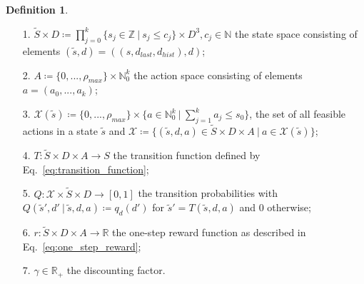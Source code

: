 \documentclass[journal, a4paper]{IEEEtran}
\theoremstyle{plain}
\theoremstyle{definition}
\newtheorem{defn}[thm]{Definition}
\begin{document}
\begin{defn} \label{def:modell} \
	\begin{itemize}
		\item[1.] $\tilde{S}  \times D \coloneqq \prod\limits_{j=0}^{k} \{s_j \in \mathbb{Z} \ | \ s_j \leq c_j\} \times D^3, c_j \in \mathbb{N}$ the state space consisting of elements $(\tilde{s}, d) = ((s, d_{last}, d_{hist}), d)$;
		\item[2.] $ A \coloneqq  \{0, ..., \rho_{max} \} \times \mathbb{N}_0^k$ the action space consisting of elements $a = (a_0, ..., a_k)$;
		\item[3.] $ \mathcal{X} (\tilde{s}) \coloneqq \{0, ..., \rho_{max} \} \times \{a \in \mathbb{N}_0^k \ | \ \sum_{j=1}^{k}a_j \leq s_0  \}$, the set of all feasible actions in a state $\tilde{s}$ and $\mathcal{X} \coloneqq \{(\tilde{s}, d , a) \in \tilde{S} \times D \times A \ | \ a \in \mathcal{X} (\tilde{s})\}$;
		\item[4.] $ T: \tilde{S}  \times D \times A \rightarrow S$ the transition function defined by Eq.~\eqref{eq:transition_function};
		\item[5.] $ Q: \mathcal{X} \times \tilde{S} \times D \rightarrow [0,1]  $ the transition probabilities with $Q(\tilde{s}', d'\ |\ \tilde{s}, d, a) \coloneqq q_d(d')$ for $\tilde{s}' = T(\tilde{s}, d, a)$ and $0$ otherwise;
		\item[6.] $ r: \tilde{S} \times D \times A \rightarrow \mathbb{R} $ the one-step reward function as described in Eq.~\eqref{eq:one_step_reward};
		\item[7.] $\gamma \in \mathbb{R}_+$ the discounting factor.
	\end{itemize}
\end{defn}
\end{document}
